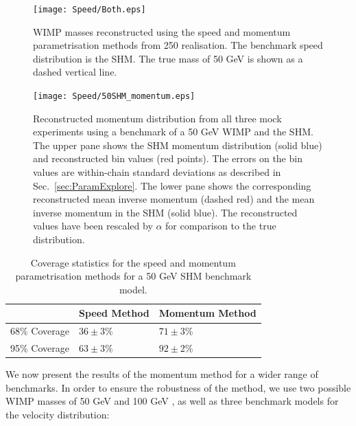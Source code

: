 \begin{figure}[t]
\centering
  \texttt{[image: Speed/Both.eps]}
  \caption[Comparison of WIMP masses reconstructed using the binned speed and momentum parametrisations]{WIMP masses reconstructed using the speed and momentum parametrisation methods from 250 realisation. The benchmark speed distribution is the SHM. The true mass of 50 GeV is shown as a dashed vertical line.} 
  \label{fig:Speed:both}
\end{figure}

\begin{figure}[t]
\centering
  \texttt{[image: Speed/50SHM\_momentum.eps]}
\caption[Reconstructed momentum distribution from all three mock experiments using a benchmark of a 50 GeV WIMP and the SHM]{Reconstructed momentum distribution from all three mock experiments using a benchmark of a 50 GeV WIMP and the SHM. The upper pane shows the SHM momentum distribution (solid blue) and reconstructed bin values (red points). The errors on the bin values are within-chain standard deviations as described in Sec.\ \ref{sec:ParamExplore}.  The lower pane shows the corresponding reconstructed mean inverse momentum (dashed red) and the mean inverse momentum in the SHM (solid blue). The reconstructed values have been rescaled by \(\alpha\) for comparison to the true distribution.}
  \label{fig:Speed:50SHM_momentum}
\end{figure}

\begin{table}[t]
  \begin{center}
    \begin{tabular}{lll}
    \hline\hline
    & Speed Method & Momentum Method \\
    \hline
    68\% Coverage & \(36 \pm 3 \%\) & \(71 \pm 3 \%\) \\
    95\% Coverage & \(63 \pm 3\%\) & \(92 \pm 2 \%\) \\
    \hline\hline
    \end{tabular}
  \end{center}
  \caption{Coverage statistics for the speed and momentum parametrisation methods for a 50 GeV SHM benchmark model.}
\label{tab:CoverageComparison}
\end{table}

We now present the results of the momentum method for a wider range of benchmarks. In order to ensure the robustness of the method, we use two possible WIMP masses of 50 GeV and 100 GeV , as well as three benchmark models for the velocity distribution:

